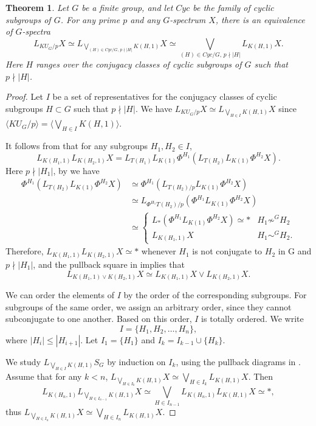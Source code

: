 \documentclass{amsart}
\theoremstyle{plain}
\newtheorem{theorem}{Theorem}[section]
\theoremstyle{definition}
\theoremstyle{remark}
\begin{document}
\begin{theorem}\label{thm:KUG local spectrum second case}
    Let $G$ be a finite group, and let $Cyc$ be the family of cyclic subgroups of $G$. For any prime $p$ and any $G$-spectrum $X$, there is an equivalence of $G$-spectra
    \[
    L_{KU_G/p}X \simeq L_{\bigvee_{(H)\in Cyc/G, \, p\nmid |H|}K(H,1)}X \simeq \bigvee_{(H)\in Cyc/G, \, p\nmid |H|} L_{K(H,1)}X.
    \]
    Here $H$ ranges over the conjugacy classes of cyclic subgroups of $G$ such that $p\nmid |H|$.
\end{theorem}
\begin{proof}
    Let $I$ be a set of representatives for the conjugacy classes of cyclic subgroups $H \subset G$ such that $p\nmid |H|$. We have $L_{KU_G/p}X\simeq L_{\bigvee_{H\in I}K(H,1)}X$ since $\langle KU_G/p\rangle=\langle \bigvee_{H\in I}K(H,1)\rangle$. 

    It follows from  that for any subgroups $H_1, H_2\in I$,
    \[
        L_{K(H_1,1)}L_{K(H_2,1)}X = L_{T(H_1)}L_{K(1)}\Phi^{H_1}(L_{T(H_2)}L_{K(1)}\Phi^{H_2}X).
    \]
    Here $p\nmid |H_1|$, by  we have 
    \[
    \begin{aligned}
        \Phi^{H_1}(L_{T(H_2)}L_{K(1)}\Phi^{H_2}X) & \simeq \Phi^{H_1}(L_{T(H_2)/p}L_{K(1)}\Phi^{H_2}X)\\
        &\simeq L_{\Phi^{H_1}T(H_2)/p}(\Phi^{H_1}L_{K(1)}\Phi^{H_2}X) \\
        &\simeq \begin{cases}
            L_\ast(\Phi^{H_1}L_{K(1)}\Phi^{H_2}X)\simeq \ast & H_1\not\sim^G H_2\\
            L_{K(H_1,1)}X & H_1\sim^G H_2.
        \end{cases}
    \end{aligned}
    \]
    Therefore, $L_{K(H_1,1)}L_{K(H_2,1)}X\simeq \ast$ whenever $H_1$ is not conjugate to $H_2$ in G and $p\nmid |H_1|$, and the pullback square in  implies that  
    \[
    L_{K(H_1,1)\vee K(H_2,1)}X\simeq L_{K(H_1,1)}X \vee L_{K(H_2,1)}X.
    \]
    

    We can order the elements of $I$ by the order of the corresponding subgroups. For subgroups of the same order, we assign an arbitrary order, since they cannot subconjugate to one another. Based on this order, $I$ is totally ordered. We write
    \[I=\{H_1,H_2,\ldots,H_n\},\]
    where $|H_i|\leq |H_{i+1}|$. Let $I_1=\{H_1\}$ and $I_k=I_{k-1} \cup \{H_k\}$. 
    
    We study $L_{\bigvee_{H\in I}K(H,1)}S_G$ by induction on $I_k$, using the pullback diagrams in . Assume that for any $k<n$, $L_{\bigvee_{H\in I_k}K(H,1)}X \simeq \bigvee_{H\in I_k} L_{K(H,1)}X$. Then
    \[ 
    L_{K(H_n,1)}L_{\bigvee_{H\in I_{n-1}}K(H,1)}X\simeq \bigvee_{H\in I_{n-1}}L_{K(H_n,1)}L_{K(H,1)}X\simeq \ast,
    \]
    thus $L_{\bigvee_{H\in I_n}K(H,1)}X \simeq \bigvee_{H\in I_n} L_{K(H,1)}X$.
\end{proof}
\end{document}
